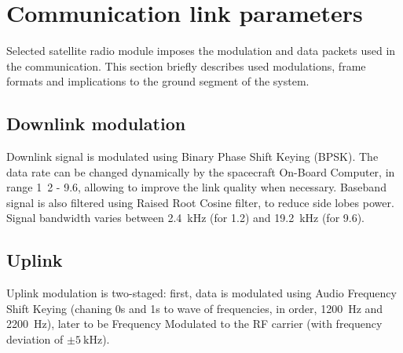 





\chapter{Communication link parameters}
Selected satellite radio module imposes the modulation and data packets used in the communication. This section briefly describes used modulations, frame formats and implications to the ground segment of the system.

\section{Downlink modulation}
Downlink signal is modulated using Binary Phase Shift Keying (BPSK). The data rate can be changed dynamically by the spacecraft On-Board Computer, in range \si{1.2} - \SI{9.6}{\kbps}, allowing to improve the link quality when necessary. Baseband signal is also filtered using Raised Root Cosine filter, to reduce side lobes power. Signal bandwidth varies between \SI{2.4}{\kHz} (for \SI{1.2}{\kbps}) and \SI{19.2}{\kHz} (for \SI{9.6}{\kbps}).


\section{Uplink}
Uplink modulation is two-staged: first, data is modulated using Audio Frequency Shift Keying (chaning 0s and 1s to wave of frequencies, in order, \SI{1200}{\hertz} and \SI{2200}{\hertz}), later to be Frequency Modulated to the RF carrier (with frequency deviation of $\pm\SI{5}{\kilo\hertz}$).

